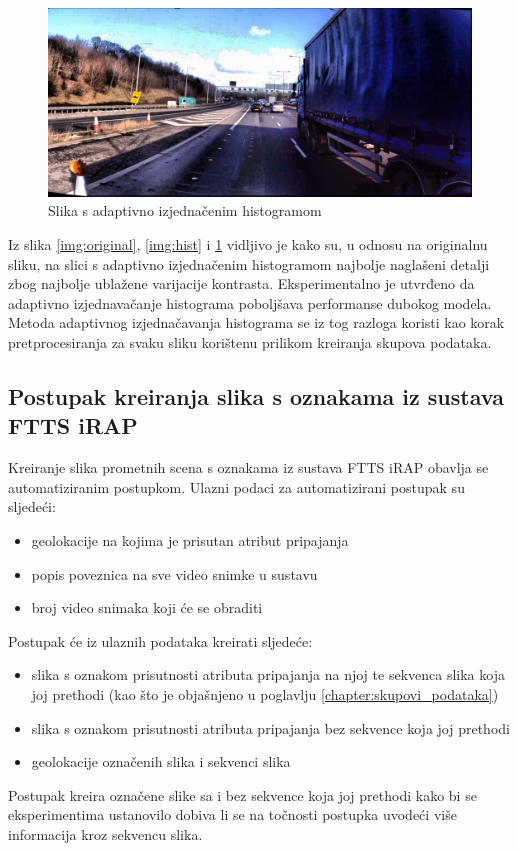 \documentclass[times, utf8, diplomski, numeric]{fer}
\begin{document}
\begin{figure}[H]
\centering
\includegraphics[scale=0.2]{images/adapt_hist.png}
\caption{Slika s adaptivno izjednačenim histogramom}
\label{img:adapt_hist}
\end{figure}

Iz slika \ref{img:original}, \ref{img:hist} i \ref{img:adapt_hist} vidljivo je kako su, u odnosu na originalnu sliku, na slici s adaptivno izjednačenim histogramom najbolje naglašeni detalji zbog najbolje ublažene varijacije kontrasta.
Eksperimentalno je utvrđeno da adaptivno izjednavačanje histograma poboljšava performanse dubokog modela.
Metoda adaptivnog izjednačavanja histograma se iz tog razloga koristi kao korak pretprocesiranja za svaku sliku korištenu prilikom kreiranja skupova podataka.

\subsection{Postupak kreiranja slika s oznakama iz sustava FTTS iRAP}
Kreiranje slika prometnih scena s oznakama iz sustava FTTS iRAP obavlja se automatiziranim postupkom.
Ulazni podaci za automatizirani postupak su sljedeći:
\begin{itemize}
 \item geolokacije na kojima je prisutan atribut pripajanja
 \item popis poveznica na sve video snimke u sustavu \citep{url:ftts_irap}
 \item broj video snimaka koji će se obraditi
\end{itemize}
Postupak će iz ulaznih podataka kreirati sljedeće:
\begin{itemize}
 \item slika s oznakom prisutnosti atributa pripajanja na njoj te sekvenca slika koja joj prethodi (kao što je objašnjeno u poglavlju \ref{chapter:skupovi_podataka})
 \item slika s oznakom prisutnosti atributa pripajanja bez sekvence koja joj prethodi
 \item geolokacije označenih slika i sekvenci slika
\end{itemize}
\noindent Postupak kreira označene slike sa i bez sekvence koja joj prethodi kako bi se eksperimentima ustanovilo dobiva li se na točnosti postupka uvodeći više informacija kroz sekvencu slika.
\end{document}
